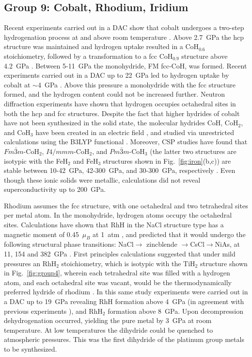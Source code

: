\documentclass[12pt,letterpaper,oneside]{article}
\begin{document}
\subsection{Group 9: Cobalt, Rhodium, Iridium}

Recent experiments carried out in a DAC show that cobalt undergoes a two-step hydrogenation process at and above room temperature \cite{Ishimatsu:2012}. Above 2.7~GPa the hcp structure was maintained and hydrogen uptake resulted in a CoH$_{0.6}$ stoichiometry, followed by a transformation to a fcc CoH$_{0.9}$ structure above 4.2~GPa \cite{Ishimatsu:2012}. Between 5-11~GPa the monohydride, FM fcc-CoH, was formed. Recent experiments carried out in a DAC up to 22~GPa led to hydrogen uptake by cobalt at $\sim$4~GPa \cite{Kuzovnikov:2015}. Above this pressure a monohydride with the fcc structure formed, and the hydrogen content could not be increased further. Neutron diffraction experiments have shown that hydrogen occupies octahedral sites in both the hcp \cite{Fedotov:1999} and fcc \cite{Antonov:2005} structures. Despite the fact that higher hydrides of cobalt have not been synthesized in the solid state, the molecular hydrides CoH, CoH$_2$, and CoH$_3$ have been created in an electric field \cite{Bialek:2001}, and studied via unrestricted calculations using the B3LYP functional \cite{Uribe:2010}. Moreover, CSP studies have found that $Fm\bar{3}m$-CoH$_2$, $I4/mmm$-CoH$_2$, and $Pm\bar{3}m$-CoH$_3$ (the latter two structures are isotypic with the FeH$_2$ and FeH$_3$ structures shown in Fig.\ \ref{fig:iron}(b,c)) are stable between 10-42~GPa, 42-300~GPa, and 30-300~GPa, respectively \cite{Wang:2018a}. Even though these ionic solids were metallic, calculations did not reveal superconductivity up to 200~GPa.

Rhodium assumes the fcc structure, with one octahedral and two tetrahedral sites per metal atom. In the monohydride, hydrogen atoms occupy the octahedral sites. Calculations have shown that RhH in the NaCl structure type has a magnetic moment of 0.45~$\mu_B$ at 1~atm \cite{Cui:2009}, and predicted that it would undergo the following structural phase transitions: NaCl$\rightarrow$ zincblende $\rightarrow$CsCl$\rightarrow$NiAs, at 11, 154 and 382~GPa \cite{Sudhapriyanga:2014}. First principles calculations suggested that under mild pressures an RhH$_2$ stoichiometry, which is isotypic with the TiH$_2$ structure shown in Fig.\ \ref{fig:group4}, wherein each tetrahedral site was filled with a hydrogen atom, and each octahedral site was vacant, would be the thermodynamically preferred hydride of rhodium \cite{Li:2011a}. In this same study experiments were carried out in a DAC up to 19~GPa revealing RhH formation above 4~GPa (in agreement with previous experiments \cite{Tkacz:1998}), and RhH$_2$ formation above 8~GPa. Upon decompression dehydrogenation occurred, yielding the pure metal by 3~GPa at room temperature. At low temperatures the dihydride could be quenched to atmospheric pressures. This was the first dihydride of the platinum group metals to be synthesized. 
\end{document}
